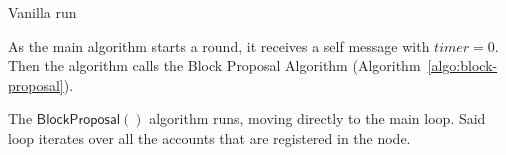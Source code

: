 \documentclass[10pt,a4paper]{article}
\begin{document}
\begin{section}{Vanilla run}
    
    
    
    As the main algorithm starts a round, it receives a self message with $timer=0$.
    Then the algorithm calls the Block Proposal Algorithm (Algorithm~\ref{algo:block-proposal}).
    
    
    
    The $\mathsf{BlockProposal}()$ algorithm runs, moving directly to the main loop. Said loop
    iterates over all the accounts that are registered in the node.
    

\end{section}
\end{document}

